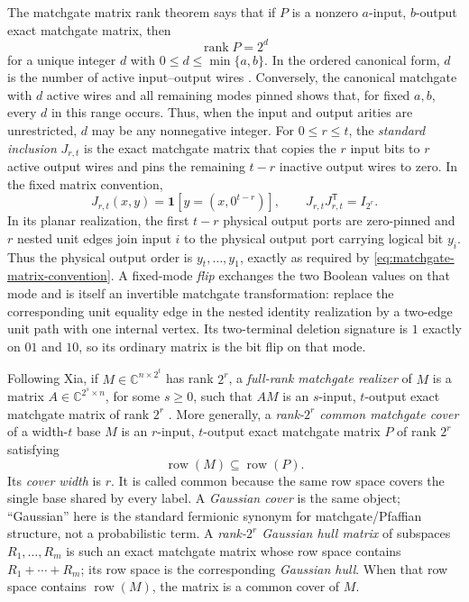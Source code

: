 \documentclass[11pt]{article}
\theoremstyle{definition}
\theoremstyle{remark}
\newcommand{\C}{\mathbb C}
\newcommand{\trans}{\mathsf T}
\newcommand{\row}{\operatorname{row}}
\newcommand{\rank}{\operatorname{rank}}
\begin{document}
The matchgate matrix rank theorem says that if $P$ is a nonzero
$a$-input, $b$-output exact matchgate matrix, then
\[
  \rank P=2^d
\]
for a unique integer $d$ with $0\le d\le\min\{a,b\}$.  In the ordered
canonical form, $d$ is the number of active input--output wires
\cite[Theorem~4.1]{Xia2016}.  Conversely, the canonical matchgate with $d$
active wires and all remaining modes pinned shows that, for fixed $a,b$,
every $d$ in this range occurs.  Thus, when the input and output arities are
unrestricted, $d$ may be any nonnegative integer.  For $0\le r\le t$, the
\emph{standard inclusion} $J_{r,t}$ is the exact matchgate matrix that
copies the $r$ input bits to $r$ active output wires and pins the remaining
$t-r$ inactive output wires to zero.  In the fixed matrix convention,
\[
  J_{r,t}(x,y)=\mathbf 1[y=(x,0^{t-r})],
  \qquad J_{r,t}J_{r,t}^{\trans}=I_{2^r}.
\]
In its planar realization, the first $t-r$ physical output ports are
zero-pinned and $r$ nested unit edges join input $i$ to the physical output
port carrying logical bit $y_i$.  Thus the physical output order is
$y_t,\ldots,y_1$, exactly as required by
\eqref{eq:matchgate-matrix-convention}.
A fixed-mode \emph{flip} exchanges the two Boolean values on that mode and
is itself an invertible matchgate transformation: replace the corresponding
unit equality edge in the nested identity realization by a two-edge unit
path with one internal vertex.  Its two-terminal deletion signature is
$1$ exactly on $01$ and $10$, so its ordinary matrix is the bit flip on
that mode.

Following Xia, if $M\in\C^{n\times2^t}$ has rank $2^r$, a
\emph{full-rank matchgate realizer} of $M$ is a matrix
$A\in\C^{2^s\times n}$, for some $s\ge0$, such that $AM$ is an
$s$-input, $t$-output exact matchgate matrix of rank $2^r$
\cite[Definition~5.1]{Xia2016}.  More generally, a
\emph{rank-$2^r$ common matchgate cover} of a width-$t$ base $M$ is an
$r$-input, $t$-output exact matchgate matrix $P$ of rank $2^r$ satisfying
\begin{equation}
  \row(M)\subseteq\row(P).
  \label{eq:common-cover-definition}
\end{equation}
Its \emph{cover width} is $r$.  It is called common because the same row
space covers the single base shared by every label.  A \emph{Gaussian
cover} is the same object; ``Gaussian'' here is the standard fermionic
synonym for matchgate/Pfaffian structure, not a probabilistic term.
A \emph{rank-$2^r$ Gaussian hull matrix} of subspaces
$R_1,\ldots,R_m$ is such an exact matchgate matrix whose row space contains
$R_1+\cdots+R_m$; its row space is the corresponding \emph{Gaussian hull}.
When that row space contains $\row(M)$, the matrix is a common cover of $M$.
\end{document}
